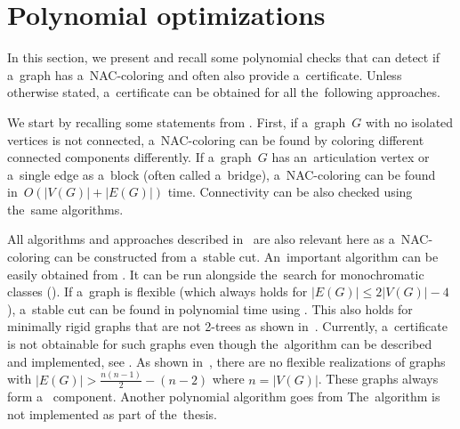 \section{Polynomial optimizations}%
\label{sec:polynomial_optimizations}

In this section, we present and recall some polynomial checks
that can detect if a~graph has a~NAC-coloring and often also provide a~certificate.
Unless otherwise stated, a~certificate can be obtained for all the~following approaches.

We start by recalling some statements from .
%
First, if a~graph~\( G \) with no isolated vertices is not connected,
a~NAC-coloring can be found by coloring different connected components differently.
%
If a~graph~\( G \) has an~articulation vertex or
a~single edge as a~block (often called a~bridge),
a~NAC-coloring can be found in~\( O(|V(G)|+|E(G)|) \) time.
Connectivity can be also checked using the~same algorithms.

All algorithms and approaches described in~
are also relevant here as a~NAC-coloring can be constructed from a~stable cut.
An~important algorithm can be easily obtained from .
It can be run alongside the~search for monochromatic classes ().
%
If a~graph is flexible (which always holds for \( |E(G)| \le 2|V(G)|-4 \)),
a~stable cut can be found in polynomial time using .
This also holds for minimally rigid graphs that are not 2-trees as shown in~.
Currently, a~certificate is not obtainable for such graphs
even though the~algorithm can be described and implemented, see .
%
As shown in~\cite{legersky_original}, there are no flexible realizations
of graphs with \( |E(G)| > \frac{n(n-1)}{2} - (n-2) \) where \( n = |V(G)| \).
These graphs always form a~\trcon{} component.
%
Another polynomial algorithm goes from 
The~algorithm is not implemented as part of the~thesis.

